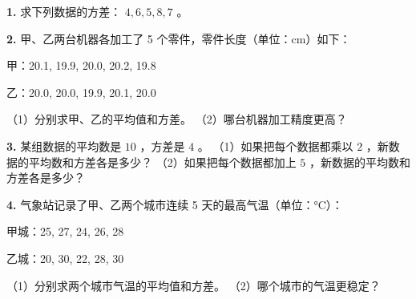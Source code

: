 \begin{practice}


\textbf{1.} 求下列数据的方差： $4, 6, 5, 8, 7$ 。

\textbf{2.} 甲、乙两台机器各加工了 5 个零件，零件长度（单位：cm）如下：

甲：20.1, 19.9, 20.0, 20.2, 19.8

乙：20.0, 20.0, 19.9, 20.1, 20.0

（1）分别求甲、乙的平均值和方差。
（2）哪台机器加工精度更高？

\textbf{3.} 某组数据的平均数是 $10$ ，方差是 $4$ 。
（1）如果把每个数据都乘以 $2$ ，新数据的平均数和方差各是多少？
（2）如果把每个数据都加上 $5$ ，新数据的平均数和方差各是多少？

\textbf{4.} 气象站记录了甲、乙两个城市连续 5 天的最高气温（单位：°C）：

甲城：25, 27, 24, 26, 28

乙城：20, 30, 22, 28, 30

（1）分别求两个城市气温的平均值和方差。
（2）哪个城市的气温更稳定？

\end{practice}




